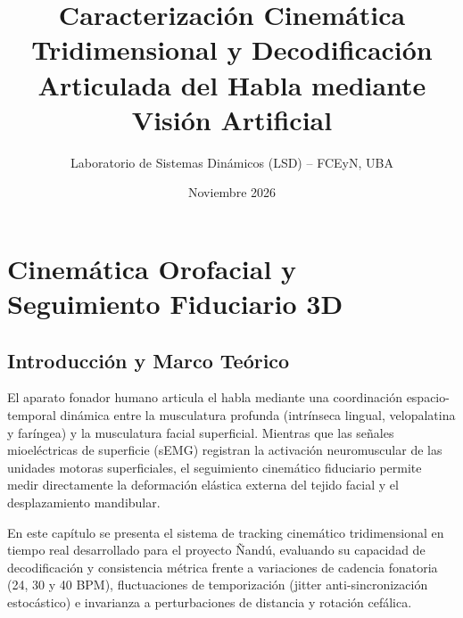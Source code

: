 \documentclass[11pt,a4paper]{report}
\title{\textbf{Caracterización Cinemática Tridimensional y Decodificación Articulada del Habla mediante Visión Artificial}}
\author{Laboratorio de Sistemas Dinámicos (LSD) -- FCEyN, UBA}
\date{Noviembre 2026}
\begin{document}
\maketitle

\chapter{Cinemática Orofacial y Seguimiento Fiduciario 3D}

\section{Introducción y Marco Teórico}
El aparato fonador humano articula el habla mediante una coordinación espacio-temporal dinámica entre la musculatura profunda (intrínseca lingual, velopalatina y faríngea) y la musculatura facial superficial. Mientras que las señales mioeléctricas de superficie (sEMG) registran la activación neuromuscular de las unidades motoras superficiales, el seguimiento cinemático fiduciario permite medir directamente la deformación elástica externa del tejido facial y el desplazamiento mandibular.

En este capítulo se presenta el sistema de tracking cinemático tridimensional en tiempo real desarrollado para el proyecto Ñandú, evaluando su capacidad de decodificación y consistencia métrica frente a variaciones de cadencia fonatoria (24, 30 y 40 BPM), fluctuaciones de temporización (jitter anti-sincronización estocástico) e invarianza a perturbaciones de distancia y rotación cefálica.
\end{document}
